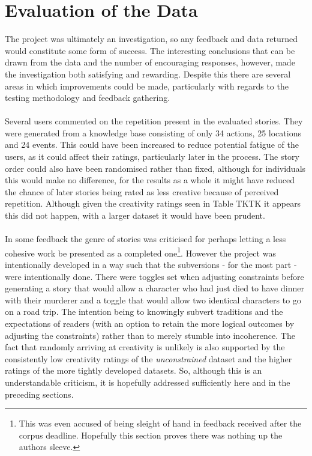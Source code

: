\documentclass[letterpaper]{article}
\begin{document}
\section{Evaluation of the Data}
The project was ultimately an investigation, so any feedback and data returned would constitute some form of success. The interesting conclusions that can be drawn from the data and the number of encouraging responses, however, made the investigation both satisfying and rewarding. Despite this there are several areas in which improvements could be made, particularly with regards to the testing methodology and feedback gathering.\\
\\Several users commented on the repetition present in the evaluated stories. They were generated from a knowledge base consisting of only 34 actions, 25 locations and 24 events. This could have been increased to reduce potential fatigue of the users, as it could affect their ratings, particularly later in the process. The story order could also have been randomised rather than fixed, although for individuals this would make no difference, for the results as a whole it might have reduced the chance of later stories being rated as less creative because of perceived repetition. Although given the creativity ratings seen in Table TKTK it appears this did not happen, with a larger dataset it would have been prudent.\\
\\In some feedback the genre of stories was criticised for perhaps letting a less cohesive work be presented as a completed one\footnote{This was even accused of being sleight of hand in feedback received after the corpus deadline. Hopefully this section proves there was nothing up the authors sleeve.}. However the project was intentionally developed in a way such that the subversions - for the most part - were intentionally done. There were toggles set when adjusting constraints before generating a story that would allow a character who had just died to have dinner with their murderer and a toggle that would allow two identical characters to go on a road trip. The intention being to knowingly subvert traditions and the expectations of readers (with an option to retain the more logical outcomes by adjusting the constraints) rather than to merely stumble into incoherence. The fact that randomly arriving at creativity is unlikely is also supported by the consistently low creativity ratings of the \emph{unconstrained} dataset and the higher ratings of the more tightly developed datasets. So, although this is an understandable criticism, it is hopefully addressed sufficiently here and in the preceding sections.\\
\end{document}

